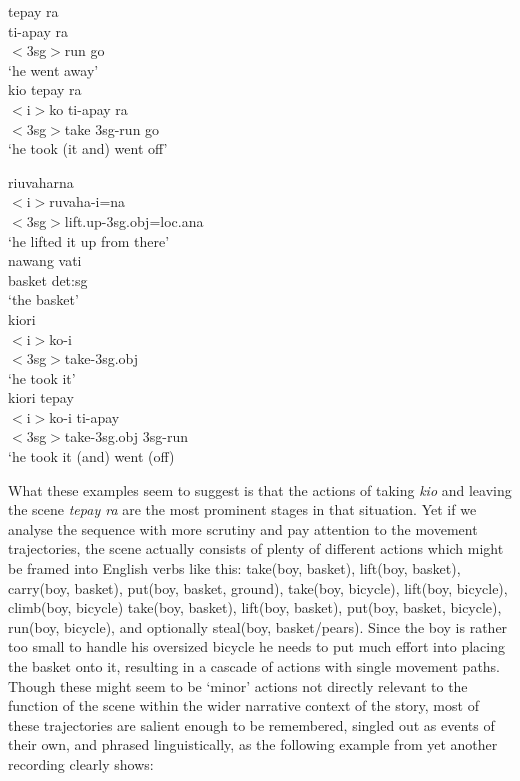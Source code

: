 \pex \label{}
\a
\gll tepay ra \\
ti-apay ra \\
\glc $<$\acs{3}\acs{sg}$>$run go \\
\glft `he went away' \\
\z
\a
\gll kio tepay ra\\
$<$i$>$ko ti-apay ra \\
\glc $<$\acs{3}\acs{sg}$>$take \acs{3}\acs{sg}-run go\\
\glft `he took (it and) went off' \ 
\z
\xe

\pex \label{}
\a
\gll riuvaharna \\
$<$i$>$ruvaha-i=na \\
\glc $<$\acs{3}\acs{sg}$>$lift.up-\acs{3}\acs{sg}.\acs{obj}=\acs{loc}.\acs{ana}\\
\glft `he lifted it up from there'\\
\z
\a
\gll nawang vati\\
basket \acs{det}:\acs{sg} \\
\glft `the basket'\\
\z
\ea
\gll kiori\\
$<$i$>$ko-i \\
\glc $<$\acs{3}\acs{sg}$>$take-\acs{3}\acs{sg}.\acs{obj}\\
\glft `he took it'\\
\z
\a
\gll kiori tepay\\
$<$i$>$ko-i ti-apay \\
\glc $<$\acs{3}\acs{sg}$>$take-\acs{3}\acs{sg}.\acs{obj} \acs{3}\acs{sg}-run\\
\glft `he took it (and) went (off) \
\z
\xe

What these examples seem to suggest is that the actions of taking \textit{kio} and leaving the scene \textit{tepay ra} are the most prominent stages in that situation. Yet if we analyse the sequence with more scrutiny and pay attention to the movement trajectories, the scene actually consists of plenty of different actions which might be framed into English verbs like this: take(boy, basket),	lift(boy, basket), carry(boy, basket), put(boy, basket, ground),	take(boy, bicycle), lift(boy, bicycle), climb(boy, bicycle) take(boy, basket), lift(boy, basket), put(boy, basket, bicycle), run(boy, bicycle), and optionally steal(boy, basket/pears). Since the boy is rather too small to handle his oversized bicycle he needs to put much effort into placing the basket onto it, resulting in a cascade of actions with single movement paths. Though these might seem to be `minor' actions not directly relevant to the function of the scene within the wider narrative context of the story, most of these trajectories are salient enough to be remembered, singled out as events of their own, and phrased linguistically, as the following example from yet another recording clearly shows:

